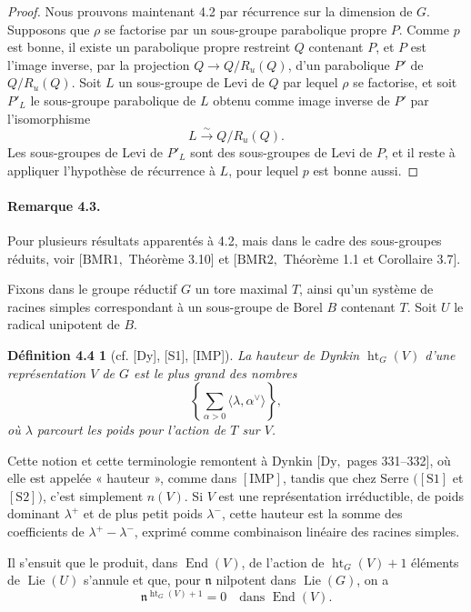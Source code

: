 \documentclass[11pt]{article}
\newcommand{\Lie}{\operatorname{Lie}}
\newcommand{\htG}{\operatorname{ht}_G}
\newcommand{\End}{\operatorname{End}}
\newtheorem*{definition44}{Définition 4.4}
\begin{document}
\begin{proof}
Nous prouvons maintenant 4.2 par récurrence sur la dimension de \(G\). Supposons que
\(\rho\) se factorise par un sous-groupe parabolique propre \(P\). Comme \(p\) est bonne,
il existe un parabolique propre restreint \(Q\) contenant \(P\), et \(P\) est l'image
inverse, par la projection \(Q\to Q/R_u(Q)\), d'un parabolique \(P'\) de
\(Q/R_u(Q)\). Soit \(L\) un sous-groupe de Levi de \(Q\) par lequel \(\rho\) se factorise,
et soit \(P'_L\) le sous-groupe parabolique de \(L\) obtenu comme image inverse de
\(P'\) par l'isomorphisme
\[
  L\xrightarrow{\sim} Q/R_u(Q).
\]
Les sous-groupes de Levi de \(P'_L\) sont des sous-groupes de Levi de \(P\), et il reste
à appliquer l'hypothèse de récurrence à \(L\), pour lequel \(p\) est bonne aussi.
\end{proof}

\paragraph{Remarque 4.3.}
Pour plusieurs résultats apparentés à 4.2, mais dans le cadre des sous-groupes réduits,
voir \([\mathrm{BMR1},\) Théorème 3.10] et \([\mathrm{BMR2},\) Théorème 1.1 et
Corollaire 3.7].

Fixons dans le groupe réductif \(G\) un tore maximal \(T\), ainsi qu'un système de
racines simples correspondant à un sous-groupe de Borel \(B\) contenant \(T\). Soit
\(U\) le radical unipotent de \(B\).

\begin{definition44}[{cf. [Dy], [S1], [IMP]}]
La hauteur de Dynkin \(\htG(V)\) d'une représentation \(V\) de \(G\) est le plus grand
des nombres
\[
  \left\{\sum_{\alpha>0}\langle\lambda,\alpha^\vee\rangle\right\},
\]
où \(\lambda\) parcourt les poids pour l'action de \(T\) sur \(V\).
\end{definition44}

Cette notion et cette terminologie remontent à Dynkin \([\mathrm{Dy},\) pages
331--332], où elle est appelée « hauteur », comme dans \([\mathrm{IMP}]\), tandis que
chez Serre \(([\mathrm{S1}]\) et \([\mathrm{S2}])\), c'est simplement \(n(V)\). Si \(V\)
est une représentation irréductible, de poids dominant \(\lambda^+\) et de plus petit
poids \(\lambda^-\), cette hauteur est la somme des coefficients de
\(\lambda^+-\lambda^-\), exprimé comme combinaison linéaire des racines simples.

Il s'ensuit que le produit, dans \(\End(V)\), de l'action de \(\htG(V)+1\) éléments de
\(\Lie(U)\) s'annule et que, pour \(\mathfrak n\) nilpotent dans \(\Lie(G)\), on a
\[
  \mathfrak n^{\htG(V)+1}=0\quad\text{dans }\End(V).
\]
\end{document}
